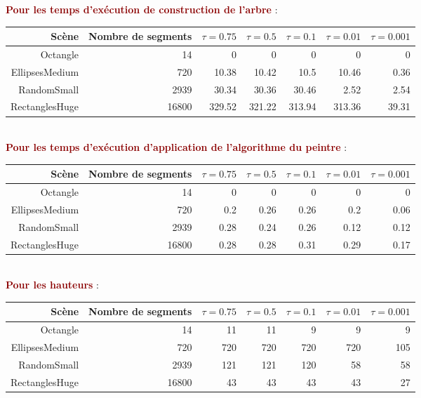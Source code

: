 \documentclass{article}
\newcommand{\dred}[1]{\textcolor{darkred}{\textbf{#1}}}
\begin{document}
\noindent \dred{Pour les temps d'exécution de construction de l'arbre} :
\begin{center}
	\begin{tabular}{|*{7}{r|}}
	\hline
	Scène & Nombre de segments & $\tau = 0.75$ & $\tau = 0.5$ & $\tau = 0.1$ & $\tau = 0.01$ & $\tau = 0.001$ \\
	\hline
	Octangle & 14 & 0 & 0 & 0 & 0 & 0 \\
	\hline
	EllipsesMedium & 720 & 10.38 & 10.42 & 10.5 & 10.46 & 0.36 \\
	\hline
	RandomSmall & 2939 & 30.34 & 30.36 & 30.46 & 2.52 & 2.54 \\
	\hline
	RectanglesHuge & 16800 & 329.52 & 321.22 & 313.94 & 313.36 & 39.31 \\
	\hline
	\end{tabular}
\end{center}
$ $ \\
\noindent \dred{Pour les temps d'exécution d'application de l'algorithme du peintre} :
\begin{center}
	\begin{tabular}{|*{7}{r|}}
	\hline
	Scène & Nombre de segments & $\tau = 0.75$ & $\tau = 0.5$ & $\tau = 0.1$ & $\tau = 0.01$ & $\tau = 0.001$ \\
	\hline
	Octangle & 14 & 0 & 0 & 0 & 0 & 0 \\
	\hline
	EllipsesMedium & 720 & 0.2 & 0.26 & 0.26 & 0.2 & 0.06 \\
	\hline
	RandomSmall & 2939 & 0.28 & 0.24 & 0.26 & 0.12 & 0.12 \\
	\hline
	RectanglesHuge & 16800 & 0.28 & 0.28 & 0.31 & 0.29 & 0.17 \\
	\hline
	\end{tabular}
\end{center}
$ $ \\
\noindent \dred{Pour les hauteurs} :
\begin{center}
	\begin{tabular}{|*{7}{r|}}
	\hline
	Scène & Nombre de segments & $\tau = 0.75$ & $\tau = 0.5$ & $\tau = 0.1$ & $\tau = 0.01$ & $\tau = 0.001$ \\
	\hline
	Octangle & 14 & 11 & 11 & 9 & 9 & 9 \\
	\hline
	EllipsesMedium & 720 & 720 & 720 & 720 & 720 & 105 \\
	\hline
	RandomSmall & 2939 & 121  & 121 & 120 & 58 & 58 \\
	\hline
	RectanglesHuge & 16800 & 43 & 43 & 43 & 43 & 27 \\
	\hline
	\end{tabular}
\end{center}
\end{document}
